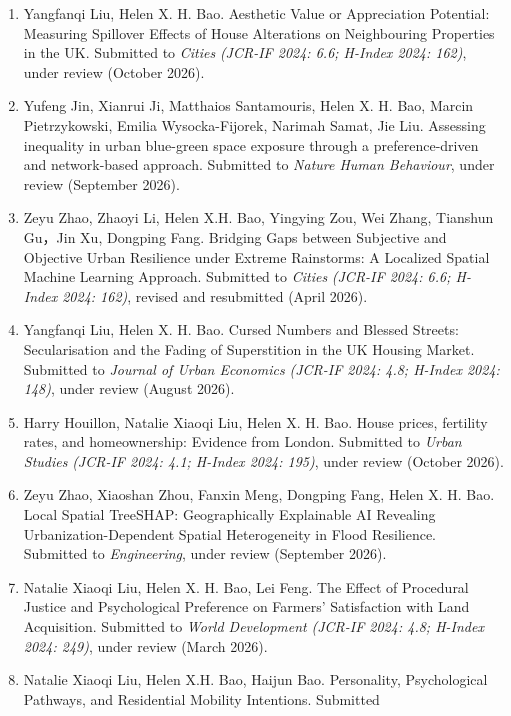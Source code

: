 \documentclass[10pt,a4paper]{article}
\providecommand{\tightlist}{%
  \setlength{\itemsep}{2pt}\setlength{\parskip}{0pt}}
\begin{document}
\begin{enumerate}
\def\labelenumi{\arabic{enumi}.}
\tightlist
\item
  Yangfanqi Liu, Helen X. H. Bao. Aesthetic Value or Appreciation
  Potential: Measuring Spillover Effects of House Alterations on
  Neighbouring Properties in the UK. Submitted to \emph{Cities}
  \emph{(JCR-IF 2024: 6.6; H-Index 2024: 162)}, under review (October
  2026).
\item
  Yufeng Jin, Xianrui Ji, Matthaios Santamouris, Helen X. H. Bao, Marcin
  Pietrzykowski, Emilia Wysocka-Fijorek, Narimah Samat, Jie Liu.
  Assessing inequality in urban blue-green space exposure through a
  preference-driven and network-based approach. Submitted to
  \emph{Nature Human Behaviour}, under review (September 2026).
\item
  Zeyu Zhao, Zhaoyi Li, Helen X.H. Bao, Yingying Zou, Wei Zhang,
  Tianshun Gu，Jin Xu, Dongping Fang. Bridging Gaps between Subjective
  and Objective Urban Resilience under Extreme Rainstorms: A Localized
  Spatial Machine Learning Approach. Submitted to \emph{Cities}
  \emph{(JCR-IF 2024: 6.6; H-Index 2024: 162)}, revised and resubmitted
  (April 2026).
\item
  Yangfanqi Liu, Helen X. H. Bao. Cursed Numbers and Blessed Streets:
  Secularisation and the Fading of Superstition in the UK Housing
  Market. Submitted to \emph{Journal of Urban Economics} \emph{(JCR-IF
  2024: 4.8; H-Index 2024: 148)}, under review (August 2026).
\item
  Harry Houillon, Natalie Xiaoqi Liu, Helen X. H. Bao. House prices,
  fertility rates, and homeownership: Evidence from London. Submitted to
  \emph{Urban Studies} \emph{(JCR-IF 2024: 4.1; H-Index 2024: 195)},
  under review (October 2026).
\item
  Zeyu Zhao, Xiaoshan Zhou, Fanxin Meng, Dongping Fang, Helen X. H. Bao.
  Local Spatial TreeSHAP: Geographically Explainable AI Revealing
  Urbanization-Dependent Spatial Heterogeneity in Flood Resilience.
  Submitted to \emph{Engineering}, under review (September 2026).
\item
  Natalie Xiaoqi Liu, Helen X. H. Bao, Lei Feng. The Effect of
  Procedural Justice and Psychological Preference on Farmers'
  Satisfaction with Land Acquisition. Submitted to \emph{World
  Development} \emph{(JCR-IF 2024: 4.8; H-Index 2024: 249)}, under
  review (March 2026).
\item
  Natalie Xiaoqi Liu, Helen X.H. Bao, Haijun Bao. Personality,
  Psychological Pathways, and Residential Mobility Intentions. Submitted

\end{enumerate}
\end{document}

